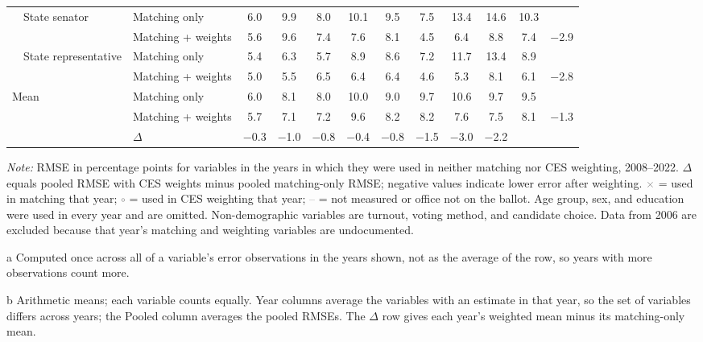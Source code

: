 \begin{table}[!htbp]
{\begin{threeparttable}
\begin{tabular}{llcccccccccc}
\addlinespace[0.1em]
~~State senator & Matching only & 6.0 & 9.9 & 8.0 & 10.1 & 9.5 & 7.5 & 13.4 & 14.6 & 10.3 & \\
 & Matching + weights & 5.6 & 9.6 & 7.4 & 7.6 & 8.1 & 4.5 & 6.4 & 8.8 & 7.4 & $-$2.9 \\
\addlinespace[0.1em]
~~State representative & Matching only & 5.4 & 6.3 & 5.7 & 8.9 & 8.6 & 7.2 & 11.7 & 13.4 & 8.9 & \\
 & Matching + weights & 5.0 & 5.5 & 6.5 & 6.4 & 6.4 & 4.6 & 5.3 & 8.1 & 6.1 & $-$2.8 \\
\midrule
Mean\tnote{b} & Matching only & 6.0 & 8.1 & 8.0 & 10.0 & 9.0 & 9.7 & 10.6 & 9.7 & 9.5 & \\
 & Matching + weights & 5.7 & 7.1 & 7.2 & 9.6 & 8.2 & 8.2 & 7.6 & 7.5 & 8.1 & $-$1.3 \\
 & $\Delta$ & $-$0.3 & $-$1.0 & $-$0.8 & $-$0.4 & $-$0.8 & $-$1.5 & $-$3.0 & $-$2.2 & & \\
\bottomrule
\end{tabular}
\begin{tablenotes}
\footnotesize
\item \textit{Note:} RMSE in percentage points for variables in the years in which they were used in neither matching nor CES weighting, 2008--2022. $\Delta$ equals pooled RMSE with CES weights minus pooled matching-only RMSE; negative values indicate lower error after weighting. \textcolor{gray}{$\times$} = used in matching that year; \textcolor{gray}{$\circ$} = used in CES weighting that year; \textcolor{gray}{--} = not measured or office not on the ballot. Age group, sex, and education were used in every year and are omitted. Non-demographic variables are turnout, voting method, and candidate choice. Data from 2006 are excluded because that year's matching and weighting variables are undocumented.
\item[a] Computed once across all of a variable's error observations in the years shown, not as the average of the row, so years with more observations count more.
\item[b] Arithmetic means; each variable counts equally. Year columns average the variables with an estimate in that year, so the set of variables differs across years; the Pooled column averages the pooled RMSEs. The $\Delta$ row gives each year's weighted mean minus its matching-only mean.
\end{tablenotes}
\end{threeparttable}%
}
\end{table}